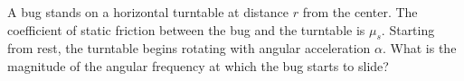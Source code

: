 A bug stands on a horizontal turntable at distance $r$ from the center.
The coefficient of static friction between the bug and the turntable
is $\mu_s$. Starting from rest, the turntable begins rotating with
angular acceleration $\alpha$. What is the magnitude of the angular frequency at which
the bug starts to slide?\answercheck
